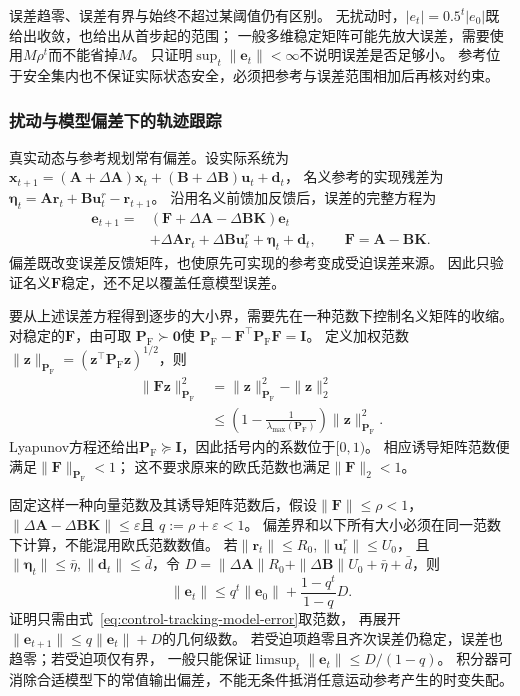 误差趋零、误差有界与始终不超过某阈值仍有区别。
无扰动时，$|e_t|=0.5^t|e_0|$既给出收敛，也给出从首步起的范围；
一般多维稳定矩阵可能先放大误差，需要使用$M\rho^t$而不能省掉$M$。
只证明$\sup_t\|\bm e_t\|<\infty$不说明误差是否足够小。
参考位于安全集内也不保证实际状态安全，必须把参考与误差范围相加后再核对约束。

\subsubsection{扰动与模型偏差下的轨迹跟踪}
真实动态与参考规划常有偏差。设实际系统为
$\bm x_{t+1}=(\bm A+\Delta\bm A)\bm x_t+
(\bm B+\Delta\bm B)\bm u_t+\bm d_t$，
名义参考的实现残差为
$\bm\eta_t=\bm A\bm r_t+\bm B\bm u_t^r-\bm r_{t+1}$。
沿用名义前馈加反馈后，误差的完整方程为
\begin{equation}
  \begin{aligned}
  \bm e_{t+1}
  ={}&(\bm F+\Delta\bm A-\Delta\bm B\bm K)\bm e_t\\
     &+\Delta\bm A\bm r_t+\Delta\bm B\bm u_t^r+\bm\eta_t+\bm d_t,
  \qquad \bm F=\bm A-\bm B\bm K.
  \end{aligned}
  \label{eq:control-tracking-model-error}
\end{equation}
偏差既改变误差反馈矩阵，也使原先可实现的参考变成受迫误差来源。
因此只验证名义$\bm F$稳定，还不足以覆盖任意模型误差。

要从上述误差方程得到逐步的大小界，需要先在一种范数下控制名义矩阵的收缩。
对稳定的$\bm F$，由可取
$\bm P_{\mathrm F}\succ\bm0$使
$\bm P_{\mathrm F}-\bm F^\top\bm P_{\mathrm F}\bm F=\bm I$。
定义加权范数$\|\bm z\|_{\bm P_{\mathrm F}}
=(\bm z^\top\bm P_{\mathrm F}\bm z)^{1/2}$，则
\[
  \begin{aligned}
  \|\bm F\bm z\|_{\bm P_{\mathrm F}}^2
  &=\|\bm z\|_{\bm P_{\mathrm F}}^2-\|\bm z\|_2^2\\
  &\leq\left(1-\frac1{\lambda_{\max}(\bm P_{\mathrm F})}\right)
          \|\bm z\|_{\bm P_{\mathrm F}}^2.
  \end{aligned}
\]
Lyapunov方程还给出$\bm P_{\mathrm F}\succeq\bm I$，因此括号内的系数位于$[0,1)$。
相应诱导矩阵范数便满足$\|\bm F\|_{\bm P_{\mathrm F}}<1$；
这不要求原来的欧氏范数也满足$\|\bm F\|_2<1$。

固定这样一种向量范数及其诱导矩阵范数后，假设$\|\bm F\|\leq\rho<1$，
$\|\Delta\bm A-\Delta\bm B\bm K\|\leq\varepsilon$且
$q:=\rho+\varepsilon<1$。
偏差界和以下所有大小必须在同一范数下计算，不能混用欧氏范数数值。
若$\|\bm r_t\|\leq R_0,\|\bm u_t^r\|\leq U_0$，
且$\|\bm\eta_t\|\leq\bar\eta,\|\bm d_t\|\leq\bar d$，令
$D=\|\Delta\bm A\|R_0+\|\Delta\bm B\|U_0+\bar\eta+\bar d$，则
\begin{equation}
  \|\bm e_t\|\leq q^t\|\bm e_0\|
         +\frac{1-q^t}{1-q}D.
  \label{eq:control-tracking-error-bound}
\end{equation}
证明只需由式~\eqref{eq:control-tracking-model-error}取范数，
再展开$\|\bm e_{t+1}\|\leq q\|\bm e_t\|+D$的几何级数。
若受迫项趋零且齐次误差仍稳定，误差也趋零；若受迫项仅有界，
一般只能保证$\limsup_t\|\bm e_t\|\leq D/(1-q)$。
积分器可消除合适模型下的常值输出偏差，不能无条件抵消任意运动参考产生的时变失配。

